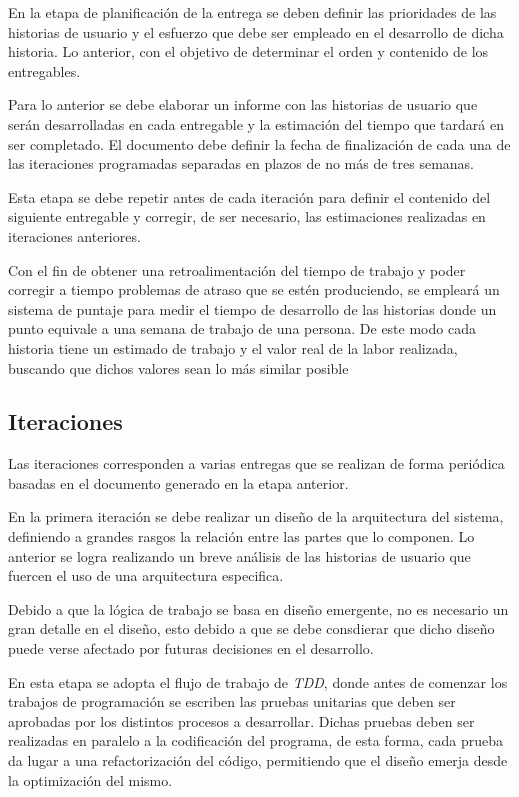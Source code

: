 En la etapa de planificación de la entrega se deben definir las prioridades de las historias de usuario y el esfuerzo que debe ser empleado en el desarrollo de dicha historia. Lo anterior, con el objetivo de determinar el orden y contenido de los entregables.

Para lo anterior se debe elaborar un informe con las historias de usuario que serán desarrolladas en cada entregable y la estimación del tiempo que tardará en ser completado. El documento debe definir la fecha de finalización de cada una de las iteraciones programadas separadas en plazos de no más de tres semanas. 

Esta etapa se debe repetir antes de cada iteración para definir el contenido del siguiente entregable y corregir, de ser necesario, las estimaciones realizadas en iteraciones anteriores.

Con el fin de obtener una retroalimentación del tiempo de trabajo y poder corregir a tiempo problemas de atraso que se estén produciendo, se empleará un sistema de puntaje para medir el tiempo de desarrollo de las historias donde un punto equivale a una semana de trabajo de una persona. De este modo cada historia tiene un estimado de trabajo y el valor real de la labor realizada, buscando que dichos valores sean lo más similar posible

\subsection{Iteraciones}

Las iteraciones corresponden a varias entregas que se realizan de forma periódica basadas en el documento generado en la etapa anterior.

En la primera iteración se debe realizar un diseño de la arquitectura del sistema, definiendo a grandes rasgos la relación entre las partes que lo componen. Lo anterior se logra realizando un breve análisis de las historias de usuario que fuercen el uso de una arquitectura especifica. 

Debido a que la lógica de trabajo se basa en diseño emergente, no es necesario un gran detalle en el diseño, esto debido a que se debe consdierar que dicho diseño puede verse afectado por futuras decisiones en el desarrollo.

En esta etapa se adopta el flujo de trabajo de \emph{TDD}, donde antes de comenzar los trabajos de programación se escriben las pruebas unitarias que deben ser aprobadas por los distintos procesos a desarrollar. Dichas pruebas deben ser realizadas en paralelo a la codificación del programa, de esta forma, cada prueba da lugar a una refactorización del código, permitiendo que el diseño emerja desde la optimización del mismo.


